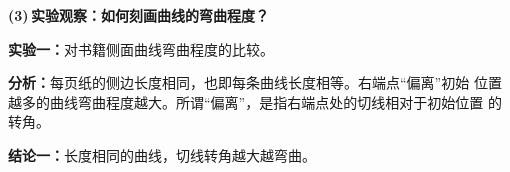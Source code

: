 \documentclass[a4paper]{article}
\begin{document}
{\bf (3)\,实验观察：如何刻画曲线的弯曲程度？}

{\bf 实验一：}对书籍侧面曲线弯曲程度的比较。

{\bf 分析：}每页纸的侧边长度相同，也即每条曲线长度相等。右端点“偏离”初始
位置越多的曲线弯曲程度越大。所谓“偏离”，是指右端点处的切线相对于初始位置
的转角。

{\bf 结论一：}长度相同的曲线，切线转角越大越弯曲。

\begin{center}
	\hspace{2cm}
	

\end{center}
\end{document}
